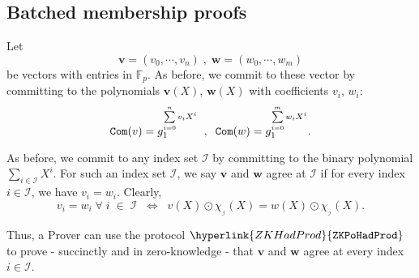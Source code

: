 \documentclass[11pt, lettersize, notitlepage, leqno, footskip=0.6cm]{article}
\newcommand{\bFp}{\mathbb{F}_p}
\newcommand{\LRA}{\Longleftrightarrow}
\newcommand{\mc}{\mathcal}
\newcommand{\mbf}{\mathbf}
\newcommand{\vs}{\vspace{-0.15cm}}
\numberwithin{equation}{section}
\begin{document}
\bigskip




\subsection{\fontsize{11}{11}\selectfont Batched membership proofs}

Let \vs $$\mbf{v} = (v_0,\cdots,v_n)\;,\;\mbf{w} = (w_0,\cdots,w_m)$$ be vectors with entries in $\bFp$. As before, we commit to these vector by committing to the polynomials $\mbf{v}(X)$, $\mbf{w}(X)$ with coefficients $v_i$, $w_i$: \vspace{-2mm} $$ {\tt{Com}}(v) = g_1^{\sum\limits_{i=0}^n v_iX^i }\;\;,\;\;{\tt{Com}}(w) = g_1^{\sum\limits_{i=0}^m w_iX^i }   .\vs  $$ 


As before, we commit to any index set $\mc{I}$ by committing to the binary polynomial $\sum_{i\in\mc{I}} X^i$. For such an index set $\mc{I}$, we say $\mbf{v}$ and $\mbf{w}$ agree at $\mc{I}$ if for every index $i\in \mc{I}$, we have $v_i = w_i$. Clearly, $$ v_i = w_i\;\forall\;i\;\in\;\mc{I}\;\;\LRA\;\; v(X)\odot \chi_{_{\mc{I}}}(X) = w(X)\odot \chi_{_{\mc{I}}}(X).        $$ 

Thus, a Prover can use the protocol $\hyperlink{ZKHadProd}{\tt{ZKPoHadProd}}$ to prove - succinctly and in zero-knowledge - that $\mbf{v}$ and $\mbf{w}$ agree at every index $i\in \mc{I}$.
\end{document}
